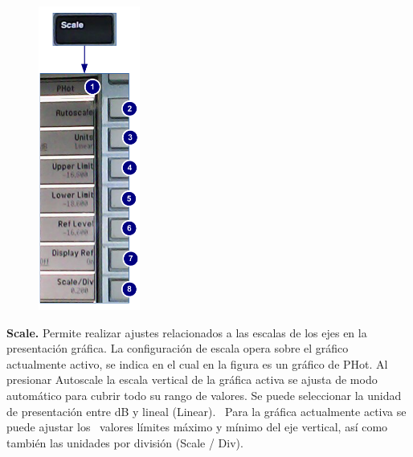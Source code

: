 	\begin{minipage}[t][11cm]{\textwidth}
		\begin{figure}		
			\centering
			\includegraphics[height=10cm]{./Imagenes/MenuScaleN8975A.pdf}	
		\end{figure}
		
		\textbf{Scale.} Permite realizar ajustes relacionados a las escalas de los ejes en la presentación gráfica. La configuración de escala opera sobre el gráfico actualmente activo, se indica en el cual en la figura es un gráfico de PHot. Al presionar Autoscale la escala vertical de la gráfica activa se ajusta de modo automático para cubrir todo su rango de valores. Se puede seleccionar la unidad de presentación entre dB y lineal (Linear). \ Para la gráfica actualmente activa se puede ajustar los \ valores límites máximo y mínimo del eje vertical, así como también las unidades por división (Scale /
		Div).	
	\end{minipage}

